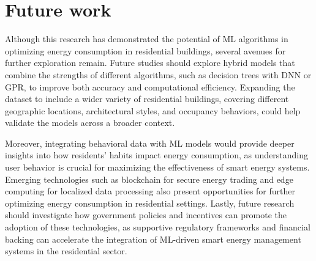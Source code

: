 \documentclass[a4paper, 12pt]{article}
\begin{document}
\section{Future work}
\quad Although this research has demonstrated the potential of ML algorithms in optimizing energy consumption in residential buildings, several avenues for further exploration remain. Future studies should explore hybrid models that combine the strengths of different algorithms, such as decision trees with DNN or GPR, to improve both accuracy and computational efficiency. Expanding the dataset to include a wider variety of residential buildings, covering different geographic locations, architectural styles, and occupancy behaviors, could help validate the models across a broader context.
\vspace{7pt}

\quad Moreover, integrating behavioral data with ML models would provide deeper insights into how residents' habits impact energy consumption, as understanding user behavior is crucial for maximizing the effectiveness of smart energy systems. Emerging technologies such as blockchain for secure energy trading and edge computing for localized data processing also present opportunities for further optimizing energy consumption in residential settings. Lastly, future research should investigate how government policies and incentives can promote the adoption of these technologies, as supportive regulatory frameworks and financial backing can accelerate the integration of ML-driven smart energy management systems in the residential sector.

\newpage


\end{document}
